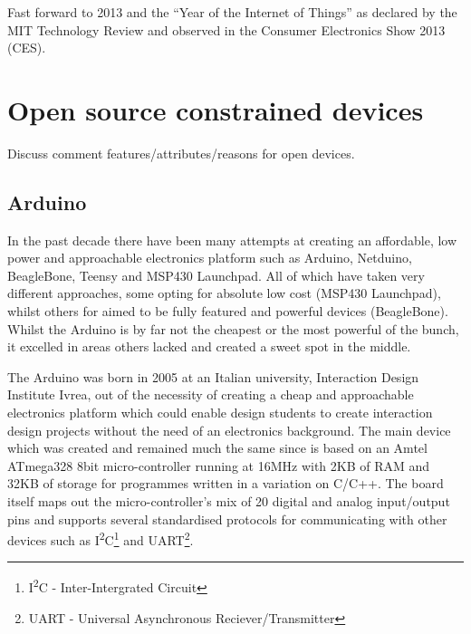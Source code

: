 \documentclass{l4proj}
\begin{document}
Fast forward to 2013 and the ``Year of the Internet of Things'' as declared by the MIT Technology Review\cite{2013IoT} and observed in the Consumer Electronics Show 2013 (CES).




\newpage
\section{Open source constrained devices} %
\label{sec:open_source_constrained_devices}
Discuss comment features/attributes/reasons for open devices.

\subsection{Arduino} %
\label{sub:arduino}
In the past decade there have been many attempts at creating an affordable, low power and approachable electronics platform such as Arduino, Netduino, BeagleBone, Teensy and MSP430 Launchpad. All of which have taken very different approaches, some opting for absolute low cost (MSP430 Launchpad), whilst others for aimed to be fully featured and powerful devices (BeagleBone). Whilst the Arduino is by far not the cheapest or the most powerful of the bunch, it excelled in areas others lacked and created a sweet spot in the middle.

The Arduino was born in 2005 at an Italian university, Interaction Design Institute Ivrea, out of the necessity of creating a cheap and approachable electronics platform which could enable design students to create interaction design projects without the need of an electronics background.
The main device which was created and remained much the same since is based on an Amtel ATmega328 8bit micro-controller running at 16MHz with 2KB of RAM and 32KB of storage for programmes written in a variation on C/C++. The board itself maps out the micro-controller's mix of 20 digital and analog input/output pins and supports several standardised protocols for communicating with other devices such as I\textsuperscript{2}C\footnote{I\textsuperscript{2}C - Inter-Intergrated Circuit} and UART\footnote{UART - Universal Asynchronous Reciever/Transmitter}. 
\end{document}
